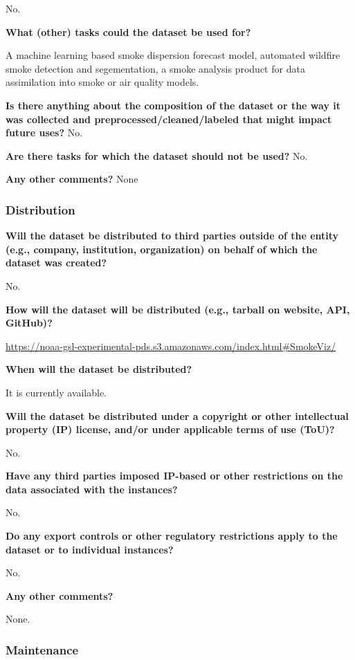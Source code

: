 \documentclass{article}
\begin{document}
No.

\textbf{What (other) tasks could the dataset be used for?}

A machine learning based smoke dispersion forecast model, automated wildfire smoke detection and segementation, a smoke analysis product for data assimilation into smoke or air quality models.

\textbf{Is there anything about the composition of the dataset or the way it was collected and preprocessed/cleaned/labeled that might impact future uses?}
No.

\textbf{Are there tasks for which the dataset should not be used?}
No.

\textbf{Any other comments?}
None

\subsubsection{Distribution}

\textbf{Will the dataset be distributed to third parties outside of the entity (e.g., company, institution, organization) on behalf of which the dataset was created? }

No.

\textbf{How will the dataset will be distributed (e.g., tarball on website, API, GitHub)?}

\url{https://noaa-gsl-experimental-pds.s3.amazonaws.com/index.html#SmokeViz/}

\textbf{When will the dataset be distributed?}

It is currently available.

\textbf{Will the dataset be distributed under a copyright or other intellectual property (IP) license, and/or under applicable terms of use (ToU)?}

No.

\textbf{Have any third parties imposed IP-based or other restrictions on the data associated with the instances?}

No.

\textbf{Do any export controls or other regulatory restrictions apply to the dataset or to individual instances?}

No.

\textbf{Any other comments?}

None.

\subsubsection{Maintenance}
\end{document}
